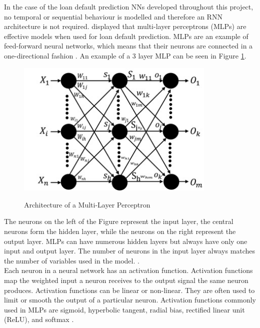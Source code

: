 In the case of the loan default prediction NNs developed throughout this project, no temporal or sequential behaviour is modelled and therefore an RNN architecture is not required. \textcite{NNWest} displayed that multi-layer perceptrons (MLPs) are effective models when used for loan default prediction. MLPs are an example of feed-forward neural networks, which means that their neurons are connected in a one-directional fashion \parencite{NNOverview}. An example of a 3 layer MLP can be seen in Figure \ref{fig:MLP}.

\vspace{10 pt}

\begin{figure}[!htb]
\centering
\includegraphics[width=0.85\textwidth]{images/mlp.jpg}
\caption{Architecture of a Multi-Layer Perceptron}
\label{fig:MLP}
\parencite{MLP}
\end{figure}

\vspace{10 pt}

The neurons on the left of the Figure represent the input layer, the central neurons form the hidden layer, while the neurons on the right represent the output layer. MLPs can have numerous hidden layers but always have only one input and output layer. The number of neurons in the input layer always matches the number of variables used in the model.  \parencite{MLP}. \\

Each neuron in a neural network has an activation function. Activation functions map the weighted input a neuron receives to the output signal the same neuron produces. Activation functions can be linear or non-linear. They are often used to limit or smooth the output of a particular neuron. Activation functions commonly used in MLPs are sigmoid, hyperbolic tangent, radial bias, rectified linear unit (ReLU), and softmax \parencite{activation_functions}. \\


